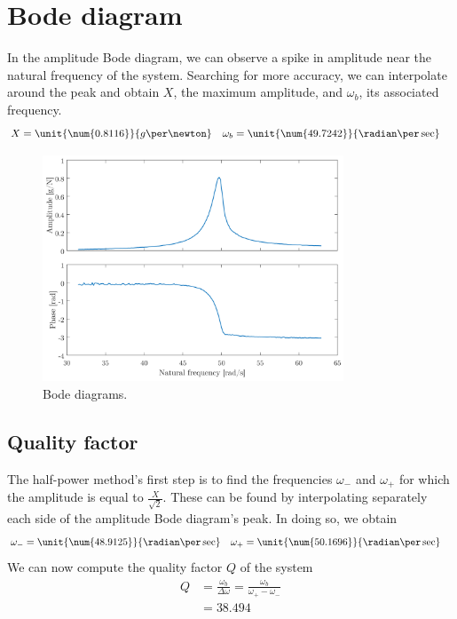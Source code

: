 \documentclass[a4paper, 12pt]{article}
\begin{document}
	\section{Bode diagram}
	In the amplitude Bode diagram, we can observe a spike in amplitude near the natural frequency of the system. Searching for more accuracy, we can interpolate around the peak and obtain $X$, the maximum amplitude, and $\omega_b$, its associated frequency.
	\begin{align*}
		X & = \unit{\num{0.8116}}{g\per\newton} & \omega_b & = \unit{\num{49.7242}}{\radian\per\sec}
	\end{align*}
	\begin{figure}[h]
		\centering
		\includegraphics[width=0.8\textwidth]{resources/pdf/bode.pdf}
		\caption{Bode diagrams.}
	\end{figure}
	\subsection{Quality factor}
	The half-power method's first step is to find the frequencies $\omega_-$ and $\omega_+$ for which the amplitude is equal to $\frac{X}{\sqrt{2}}$. These can be found by interpolating separately each side of the amplitude Bode diagram's peak. In doing so, we obtain
	\begin{align*}
		\omega_- & = \unit{\num{48.9125}}{\radian\per\sec} & \omega_+ & = \unit{\num{50.1696}}{\radian\per\sec}
	\end{align*}
	We can now compute the quality factor $Q$ of the system
	\begin{align*}
		Q & = \frac{\omega_b}{\Delta \omega} = \frac{\omega_b}{\omega_+ - \omega_-} \\
		  & = \num{38.494}
	\end{align*}
\end{document}
